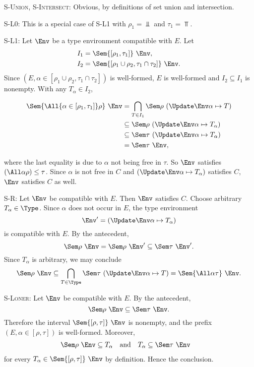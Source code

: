 \documentclass{amsart}
\begin{document}
\textsc{S-Union}, \textsc{S-Intersect}: Obvious, by definitions
of set union and intersection.

\textsc{S-L0}: This is a special case of \textsc{S-L1} with
$\rho_1=\Bot$ and $\tau_1=\Top$.

\textsc{S-L1}:
Let $\Env$ be a type environment compatible with $E$. Let
\begin{align*}
I_1 &= \Sem{[\rho_1,\tau_1]}~\Env,\\
I_2 &= \Sem{[\rho_1\cup\rho_2, \tau_1\cap\tau_2]}~\Env.
\end{align*}
Since $(E,\alpha\in [\rho_1\cup\rho_2, \tau_1\cap\tau_2])$ is
well-formed, $E$ is well-formed and $I_2\subseteq I_1$ is
nonempty. With any $T_\alpha\in I_2$,
\begin{samepage}
\begin{align*}
\Sem{\All{\alpha\in[\rho_1,\tau_1]}\rho}~\Env
&=\bigcap_{T\in I_1}\Sem\rho~(\Update\Env\alpha\mapsto T)\\
&\subseteq
\Sem\rho~(\Update\Env\alpha\mapsto T_\alpha)\\
&\subseteq
\Sem\tau~(\Update\Env\alpha\mapsto T_\alpha)\\
&=\Sem\tau~\Env,
\end{align*}
\end{samepage}%
where the last equality is due to $\alpha$ not being free in
$\tau$. So $\Env$ satisfies $(\All\alpha\rho)\le\tau$. Since
$\alpha$ is not free in $C$ and $(\Update\Env\alpha\mapsto
T_\alpha)$ satisfies $C$, $\Env$ satisfies $C$ as well.

\textsc{S-R}: Let $\Env$ be compatible with $E$. Then $\Env$
satisfies $C$. Choose arbitrary $T_\alpha\in\Type$. Since
$\alpha$ does not occur in $E$, the type environment
\[
\Env'=(\Update\Env\alpha\mapsto T_\alpha)
\]
is compatible with $E$. By the antecedent,
\[
\Sem\rho~\Env = \Sem\rho~\Env' \subseteq \Sem\tau~\Env'.
\]
Since $T_\alpha$ is arbitrary, we may conclude
\[
\Sem\rho~\Env
\subseteq
\bigcap_{T\in\Type}\Sem\tau~(\Update\Env\alpha\mapsto T)
=\Sem{\All\alpha\tau}~\Env.
\]

\textsc{S-Loner}: Let $\Env$ be compatible with $E$. By the
antecedent,
\[
\Sem\rho~\Env\subseteq\Sem\tau~\Env.
\]
Therefore the interval $\Sem{[\rho,\tau]}~\Env$ is nonempty, and
the prefix $(E,\alpha\in [\rho,\tau])$ is well-formed. Moreover,
\begin{align*}
\Sem\rho~\Env&\subseteq T_\alpha&
&\mbox{and}&
T_\alpha&\subseteq\Sem\tau~\Env
\end{align*}
for every $T_\alpha\in \Sem{[\rho,\tau]}~\Env$ by definition.
Hence the conclusion.
\end{document}
